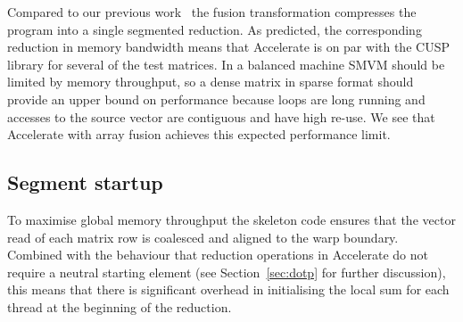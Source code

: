 Compared to our previous work~\cite{Chakravarty:2011fr} the fusion
transformation compresses the program into a single segmented reduction. As
predicted, the corresponding reduction in memory bandwidth means that Accelerate
is on par with the CUSP library for several of the test matrices. In a balanced
machine SMVM should be limited by memory throughput, so a dense matrix in
sparse format should provide an upper bound on performance because loops are
long running and accesses to the source vector are contiguous and have high
re-use. We see that Accelerate with array fusion achieves this expected
performance limit. %

\subsection{Segment startup}

To maximise global memory throughput the skeleton code ensures that the vector
read of each matrix row is coalesced and aligned to the warp boundary. Combined
with the behaviour that reduction operations in Accelerate do not require a
neutral starting element (see Section~\ref{sec:dotp} for further discussion),
this means that there is significant overhead in initialising the local sum for
each thread at the beginning of the reduction.


